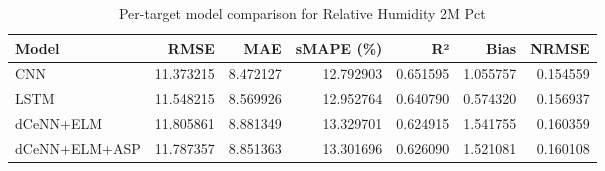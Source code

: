 \begin{table}
\caption{Per-target model comparison for Relative Humidity 2M Pct}
\begin{tabular}{lrrrrrr}
\toprule
Model & RMSE & MAE & sMAPE (\%) & R² & Bias & NRMSE \\
\midrule
CNN & 11.373215 & 8.472127 & 12.792903 & 0.651595 & 1.055757 & 0.154559 \\
LSTM & 11.548215 & 8.569926 & 12.952764 & 0.640790 & 0.574320 & 0.156937 \\
dCeNN+ELM & 11.805861 & 8.881349 & 13.329701 & 0.624915 & 1.541755 & 0.160359 \\
dCeNN+ELM+ASP & 11.787357 & 8.851363 & 13.301696 & 0.626090 & 1.521081 & 0.160108 \\
\bottomrule
\end{tabular}
\end{table}
